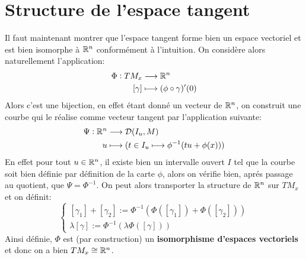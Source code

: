 \section{Structure de l'espace tangent}
Il faut maintenant montrer que l'espace tangent forme bien un espace vectoriel et est bien isomorphe à \( \mathbb{R}^n \) conformément à l'intuition. On considère alors naturellement l'application:
\[ 
   \begin{aligned}
      \Phi : TM_x  &\longrightarrow \mathbb{R}^n \\
      [\gamma] &\longmapsto (\phi \circ \gamma)'(0)
   \end{aligned}
\]
Alors c'est une bijection, en effet étant donné un vecteur de \( \mathbb{R}^n \), on construit une courbe qui le réalise comme vecteur tangent par l'application suivante:
\[ 
   \begin{aligned}
      \Psi : \mathbb{R}^n  &\longrightarrow \mathcal{D}(I_u, M) \\
      u &\longmapsto (t \in I_u \longmapsto \phi^{-1}(tu + \phi(x)))
   \end{aligned}
\]
En effet pour tout \( u \in \mathbb{R}^n \), il existe bien un intervalle ouvert \( I \) tel que la courbe soit bien définie par définition de la carte \( \phi \), alors on vérifie bien, aprés passage au quotient, que \( \Psi = \Phi^{-1}\). On peut alors transporter la structure de \( \mathbb{R}^n \) sur \( TM_x \) et on définit:
\[ 
   \begin{cases}
      [\gamma_1] + [\gamma_2] := \Phi^{-1}(\Phi([\gamma_1]) + \Phi([\gamma_2]))\\
      \lambda[\gamma] := \Phi^{-1}(\lambda\Phi([\gamma]))  
   \end{cases} 
\]
Ainsi définie, \( \Phi \) est (par construction) un \textbf{isomorphisme d'espaces vectoriels} et donc on a bien \( TM_x \cong \mathbb{R}^n \).
